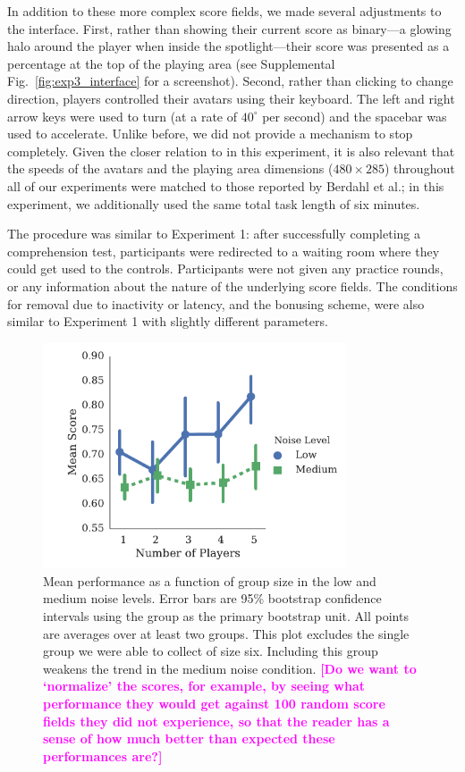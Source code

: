 \documentclass[12pt,letterpaper]{article}
\newcommand{\andrew}[1]{\textcolor{magenta}{\bf [#1]}}
\begin{document}
In addition to these more complex score fields, we made several adjustments to the interface.
First, rather than showing their current score as binary---a glowing halo around the player when inside the spotlight---their score was presented as a percentage at the top of the playing area (see Supplemental Fig.~\ref{fig:exp3_interface} for a screenshot).
Second, rather than clicking to change direction, players controlled their avatars using their keyboard. 
The left and right arrow keys were used to turn (at a rate of $40^\circ$ per second) and the
spacebar was used to accelerate. 
Unlike before, we did not provide a mechanism to stop completely.  
Given the closer relation to  in this experiment, it is also relevant that the speeds of the avatars and the playing area dimensions ($480 \times 285$) throughout all of our experiments were matched to those reported by Berdahl et al.; in this experiment, we additionally used the same total task length of six minutes.

The procedure was similar to Experiment 1: after successfully completing a comprehension test,  participants were redirected to a waiting room where they could get used to the controls.  
Participants were not given any practice rounds, or any information about the nature of the underlying score fields.
The conditions for removal due to inactivity or latency, and the bonusing scheme, were also similar to Experiment 1 with slightly different parameters.

\begin{figure}[t]
  \centering
  \includegraphics[width=0.8\textwidth]{./figures/performance-summary}
  \caption{Mean performance as a function of group size in the low and
    medium noise levels.  Error bars are 95\% bootstrap confidence
    intervals using the group as the primary bootstrap unit.  All
    points are averages over at least two groups.  This plot excludes
    the single group we were able to collect of size six.  Including
    this group weakens the trend in the medium noise condition. \andrew{Do we want to `normalize' the scores, for example, by seeing what performance they would get against 100 random score fields they did not experience, so that the reader has a sense of how much better than expected these performances are?}}
  \label{fig:performance}
\end{figure}
\end{document}
